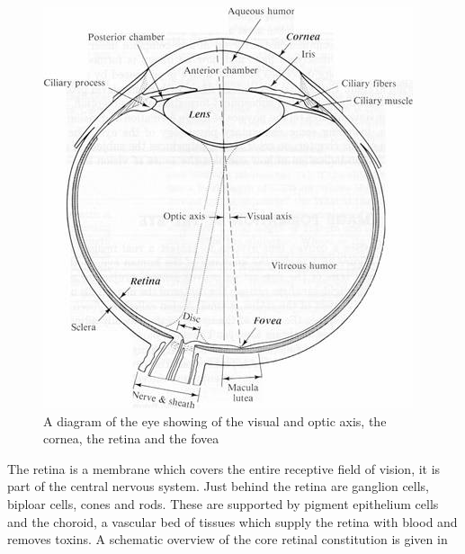 \begin{figure}[htbp]
  \centering
    \includegraphics{figures/eye_diagram}
  \caption{A diagram of the eye showing of the visual
   and optic axis, the cornea, the retina and the fovea}
  \label{fig:optic_axis}
\end{figure} 

The retina is a membrane which covers the entire receptive field of
vision, it is part of the central nervous system.\cite{rogers1983neurite}
Just behind the retina are ganglion cells, biploar cells, cones and rods.
These are supported by pigment epithelium cells and the choroid, a vascular
bed of tissues which supply the retina with blood and removes toxins.
\cite{lutty1996localization} A schematic overview of the core retinal
constitution is given in 

